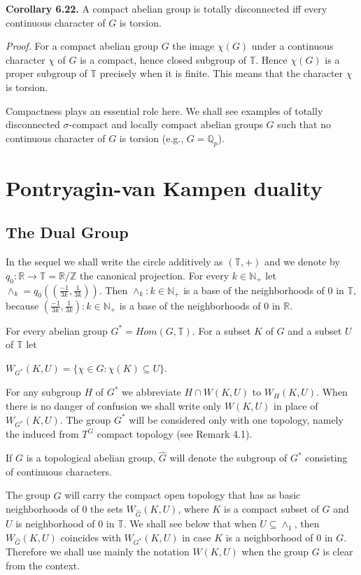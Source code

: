 \documentclass[12pt]{article}
\begin{document}
\begin{itemize}
\begin{itemize}
\textbf{Corollary 6.22.} A compact abelian group is totally disconnected iff every continuous character of $G$ is torsion.


\emph{Proof.} For a compact abelian group $G$ the image $\chi(G)$ under a continuous character $\chi$ of $G$ is a compact, hence
closed subgroup of $\mathbb{T}$. Hence $\chi(G)$ is a proper subgroup of $\mathbb{T}$ precisely when it is finite. This means that the
character $\chi$ is torsion.


    Compactness plays an essential role here. We shall see examples of totally disconnected $\sigma$-compact and
locally compact abelian groups $G$ such that no continuous character of $G$ is torsion (e.g., $G = \mathbb{Q}_p$).


\section{Pontryagin-van Kampen duality}

\subsection{The Dual Group}


In the sequel we shall write the circle additively as $(\mathbb{T}, +)$ and we denote by $q_0 : \mathbb{R} \to \mathbb{T} = \mathbb{R}/\mathbb{Z}$ the canonical
projection. For every $k \in \mathbb{N}_+$ let $\wedge_k = q_0((\frac{-1}{3k},\frac{1}{3k}))$. Then ${\wedge_k : k \in \mathbb{N}_+}$ is a base of the neighborhoods of 0
in $\mathbb{T}$, because ${(\frac{-1}{3k}, \frac{1}{3k}) : k \in \mathbb{N}_+}$ is a base of the neighborhoods of 0 in $\mathbb{R}$.


    For every abelian group $G^* = Hom (G,\mathbb{T})$. For a subset $K$ of $G$ and a subset $U$ of $\mathbb{T}$ let


        $W_{G^*} (K, U) = \{\chi \in G : \chi(K) \subseteq U\}$.


    For any subgroup $H$ of $G^*$ we abbreviate $H \cap W(K, U)$ to $W_H (K, U)$. When there is no danger of confusion
we shall write only $W(K, U)$ in place of $W_{G^*} (K, U)$. The group $G^*$ will be considered only with one topology,
namely the induced from ${T}^G$ compact topology (see Remark 4.1).


    If $G$ is a topological abelian group, $\hat{G}$ will denote the subgroup of $G^*$ consisting of continuous characters.


    The group $\hat{G}$ will carry the compact open topology that has as basic neighborhoods of 0 the sets $W_{\hat{G}}(K, U)$,
where $K$ is a compact subset of $G$ and $U$ is neighborhood of 0 in $\mathbb{T}$. We shall see below that when $U \subseteq \wedge_1$,
then $W_{\hat{G}}(K, U)$ coincides with $W_{G^*} (K, U)$ in case $K$ is a neighborhood of 0 in $G$. Therefore we shall use mainly
the notation $W(K, U)$ when the group $G$ is clear from the context.



\end{itemize}
\end{itemize}
\end{document}
